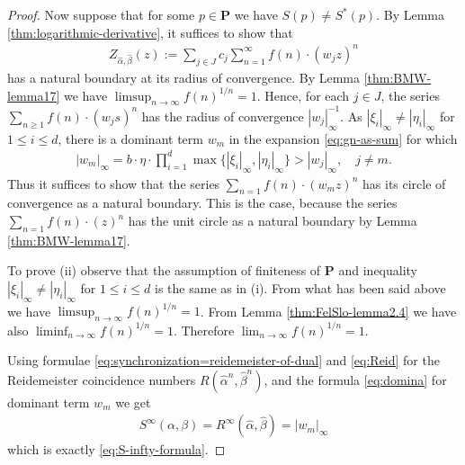 \documentclass[oneside]{amsart}
\begin{document}
\begin{proof}
  Now suppose that for some $p \in \mathbf{P}$ we have $S(p) \neq S^*(p)$.
  By Lemma \ref{thm:logarithmic-derivative}, it suffices to show that
  \begin{align*}
    Z_{\widehat{\alpha}, \widehat{\beta}}(z) := \sum_{j \in J} c_j \sum_{n=1}^\infty f(n) \cdot (w_j z)^n
  \end{align*}
  has a natural boundary at its radius of convergence.
  By Lemma \ref{thm:BMW-lemma17} we have $\limsup_{n\to\infty} f(n)^{1/n} = 1$.
  Hence, for each $j \in J$, the series $\sum_{n\geq 1} f(n) \cdot (w_j s)^n$
  has the radius of convergence $|w_j|_\infty^{-1}$.
  As  $|\xi_i|_\infty \neq |\eta_i|_\infty$ for $1 \leq i \leq d$, there is a dominant term $w_m$ in the expansion
  \eqref{eq:gn-as-sum}   for which
  \begin{align} \label{eq:domina}
    |w_m|_\infty =  b \cdot \eta \cdot
     \prod_{i=1}^{d} \max \big\{ |\xi_{i}|_\infty, |\eta_{i}|_\infty \big\} > |w_j|_\infty, \quad j \neq m.
  \end{align}
  Thus it suffices to show that the series $\sum_{n=1} f(n) \cdot (w_m z)^n$ has  its circle  of convergence as a natural boundary. This is the case, because the series $\sum_{n=1} f(n) \cdot (z)^n$ has the unit circle as a natural boundary by Lemma \ref{thm:BMW-lemma17}.

  To prove (ii) observe that the assumption of finiteness of $\mathbf{P}$ and inequality
  $|\xi_i|_\infty \neq |\eta_i|_\infty$ for $1 \leq i \leq d$ is the same as in (i).
  From what has been said above we have $\limsup_{n \to \infty} f(n)^{1/n} = 1$.
  From Lemma \ref{thm:FelSlo-lemma2.4} we have also $\liminf_{n \to \infty} f(n)^{1/n} = 1$.
  Therefore $\lim_{n \to \infty} f(n)^{1/n} = 1$.

  Using formulae \eqref{eq:synchronization=reidemeister-of-dual} and \eqref{eq:Reid}
  for the Reidemeister coincidence numbers $R(\widehat{\alpha}^n,\widehat{\beta}^n)$,
  and the formula \eqref{eq:domina} for dominant term $w_m$ we get
  \begin{align}
    S^\infty(\alpha, \beta) = R^\infty(\widehat{\alpha}, \widehat{\beta})  = |w_m|_\infty
  \end{align}
  which is exactly \eqref{eq:S-infty-formula}.
\end{proof}
\end{document}

